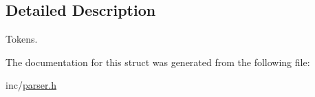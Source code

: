 \subsection{Detailed Description}
Tokens. 

The documentation for this struct was generated from the following file\+:\begin{DoxyCompactItemize}
\item 
inc/\hyperlink{parser_8h}{parser.\+h}\end{DoxyCompactItemize}
